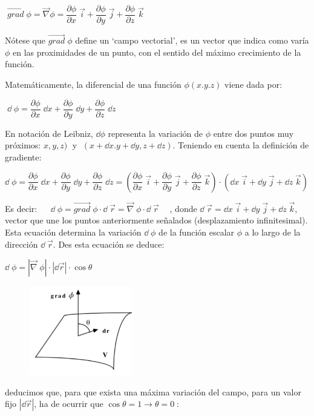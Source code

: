 \vspace{4mm}\centerline{ $\boxed{ \; \overrightarrow {grad} \; \phi =  \overrightarrow {\nabla} \phi = \dfrac {\partial \phi}{\partial x}\; \vec i +  \dfrac {\partial \phi}{\partial y}\; \vec j +  \dfrac {\partial \phi}{\partial z}\; \vec k   \;} $}

Nótese que $\overrightarrow {grad} \; \phi $ define un `campo vectorial', es un vector que indica como varía $\phi$ en las proximidades de un punto, con el sentido del máximo crecimiento de la función.

Matemáticamente, la diferencial de una función $\phi (x.y.z)$ viene dada por:

\vspace{4mm}\centerline {$\boxed{ \; \dd \; \phi = \dfrac {\partial \phi}{\partial x}\; \dd x +  \dfrac {\partial \phi}{\partial y}\; \dd y + \dfrac {\partial \phi}{\partial z}\; \dd z \; }$}

\vspace{2mm} En notación de Leibniz, $\dd \phi$ representa la variación de $\phi$ entre dos puntos muy próximos: $x,y,z)\; $ y $\; (x+\dd x. y +\dd y, z +\dd z)$. Teniendo en cuenta la definición de gradiente:

$\dd \; \phi = \dfrac {\partial \phi}{\partial x}\; \dd x +  \dfrac {\partial \phi}{\partial y}\; \dd y + \dfrac {\partial \phi}{\partial z}\; \dd z = \left( \dfrac {\partial \phi}{\partial x}\; \vec i + \dfrac {\partial \phi}{\partial y}\; \vec j + \dfrac {\partial \phi}{\partial z}\; \vec k     \right) \cdot (\dd x \; \vec i + \dd y \; \vec j + \dd z \; \vec k)$
\begin{multicols}{2}
\vspace{3mm} Es decir: $\quad \boxed {\; \dd\; \phi = \overrightarrow {grad}\; \phi \cdot \dd \; \vec r = \overrightarrow { \nabla} \; \phi \cdot \dd \; \vec r \;} \quad$, donde $\dd \; \vec r = \dd x \; \vec i +\dd y \; \vec j + \dd z \; \vec k$, vector que une los puntos anteriormente señalados (desplazamiento infinitesimal). Esta ecuación determina la variación  $\dd \; \phi$ de la función escalar $\phi$ a lo largo de la dirección $\dd \; \vec r$. Des esta ecuación se deduce:

$\dd \; \phi = |\overrightarrow{\nabla}\; \phi |\cdot |\dd \vec r|\cdot \cos \theta$

	\begin{figure}[H]
	\centering
	\includegraphics[width=0.4\textwidth]{imagenes/imagenes10/T10IM21.png}
	\end{figure}
\end{multicols}
deducimos que, para que exista una máxima variación del campo, para un valor fijo $|\dd \vec r|$, ha de ocurrir que 
$\cos \theta=1 \to \theta = 0\; $:  

